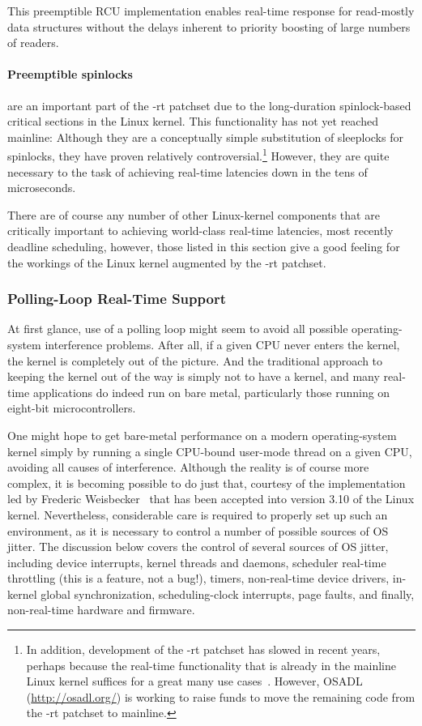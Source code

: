 This preemptible RCU implementation enables real-time response for
read-mostly data structures without the delays inherent to priority
boosting of large numbers of readers.

\paragraph{Preemptible spinlocks}
are an important part of the -rt patchset due to the long-duration
spinlock-based critical sections in the Linux kernel.
This functionality has not yet reached mainline: Although they are a conceptually
simple substitution of sleeplocks for spinlocks, they have proven relatively
controversial.\footnote{
	In addition, development of the -rt patchset has slowed in recent
	years, perhaps because the real-time functionality that is already
	in the mainline Linux kernel suffices for a great many use
	cases~\cite{JakeEdge2013Future-rtLinux,JakeEdge2014Future-rtLinux}.
	However, OSADL (\url{http://osadl.org/}) is working to raise funds
	to move the remaining code from the -rt patchset to mainline.}
However, they are quite necessary to the task of achieving real-time
latencies down in the tens of microseconds.

There are of course any number of other Linux-kernel components that are
critically important to achieving world-class real-time latencies,
most recently deadline scheduling,
however, those listed in this section give a good feeling for the workings
of the Linux kernel augmented by the -rt patchset.

\subsubsection{Polling-Loop Real-Time Support}
\label{sec:advsync:Polling-Loop Real-Time Support}

At first glance, use of a polling loop might seem to avoid all possible
operating-system interference problems.
After all, if a given CPU never enters the kernel, the kernel is
completely out of the picture.
And the traditional approach to keeping the kernel out of the way is
simply not to have a kernel, and many real-time applications do
indeed run on bare metal, particularly those running on eight-bit
microcontrollers.

One might hope to get bare-metal performance on a modern operating-system
kernel simply by running a single CPU-bound user-mode thread on a
given CPU, avoiding all causes of interference.
Although the reality is of course more complex, it is becoming
possible to do just that,
courtesy of the  implementation led by
Frederic Weisbecker~\cite{JonCorbet2013NO-HZ-FULL} that has been
accepted into version 3.10 of the Linux kernel.
Nevertheless, considerable care is required to properly set up such
an environment, as it is necessary to control a number of possible
sources of OS jitter.
The discussion below covers the control of several sources of OS
jitter, including device interrupts, kernel threads and daemons,
scheduler real-time throttling (this is a feature, not a bug!),
timers, non-real-time device drivers, in-kernel global synchronization,
scheduling-clock interrupts, page faults, and finally, non-real-time
hardware and firmware.

